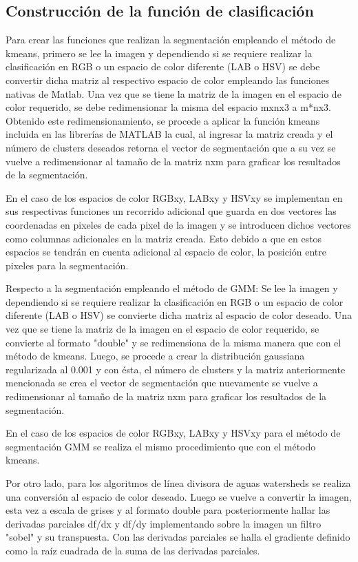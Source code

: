\documentclass[10pt,twocolumn,letterpaper]{article}
\begin{document}
\subsection{Construcción de la función de clasificación}

Para crear las funciones que realizan la segmentación empleando el método de kmeans, primero se lee la imagen y dependiendo si se requiere realizar la clasificación en RGB o un espacio de color diferente (LAB o HSV) se debe convertir dicha matriz al respectivo espacio de color empleando las funciones nativas de Matlab. Una vez que se tiene la matriz de la imagen en el espacio de color requerido, se debe redimensionar la misma del espacio mxnx3 a m*nx3. Obtenido este redimensionamiento, se procede a aplicar la función kmeans incluida en las librerías de MATLAB la cual, al ingresar la matriz creada y el número de clusters deseados retorna el vector de segmentación que a su vez se vuelve a redimensionar al tamaño de la matriz nxm para graficar los resultados de la segmentación.

En el caso de los espacios de color RGBxy, LABxy y HSVxy se implementan en sus respectivas funciones un recorrido adicional que guarda en dos vectores las coordenadas en pixeles de cada pixel de la imagen y se introducen dichos vectores como columnas adicionales en la matriz creada. Esto debido a que en estos espacios se tendrán en cuenta adicional al espacio de color, la posición entre pixeles para la segmentación.

Respecto a la segmentación empleando el método de GMM: Se lee la imagen y dependiendo si se requiere realizar la clasificación en RGB o un espacio de color diferente (LAB o HSV) se convierte dicha matriz al espacio de color deseado. Una vez que se tiene la matriz de la imagen en el espacio de color requerido, se convierte al formato "double" y se redimensiona de la misma manera que con el método de kmeans. Luego, se procede a crear la distribución gaussiana regularizada al 0.001 y con ésta, el número de clusters y la matriz anteriormente mencionada se crea el vector de segmentación que nuevamente se vuelve a redimensionar al tamaño de la matriz nxm para graficar los resultados de la segmentación.

En el caso de los espacios de color RGBxy, LABxy y HSVxy para el método de segmentación GMM se realiza el mismo procedimiento que con el método kmeans.

Por otro lado, para los algoritmos de línea divisora de aguas watersheds se realiza una conversión al espacio de color deseado. Luego se vuelve a convertir la imagen, esta vez a escala de grises y al formato double para posteriormente hallar las derivadas parciales df/dx y df/dy implementando sobre la imagen un filtro "sobel" y su transpuesta. Con las derivadas parciales se halla el gradiente definido como la raíz cuadrada de la suma de las derivadas parciales.
\end{document}
